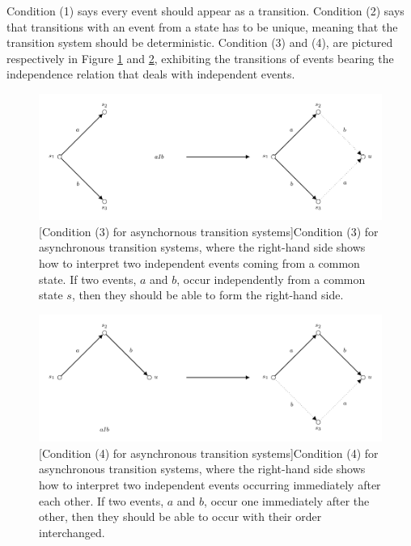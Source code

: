     Condition (1) says every event should appear as a transition. Condition (2) says that transitions with an event from a state has to be unique, meaning that the transition system should be deterministic. Condition (3) and (4), are pictured respectively in Figure \ref{fig:condition-3-asynchronous-transition-systems} and \ref{fig:condition-4-asynchronous-transition-systems}, exhibiting the transitions of events bearing the independence relation that deals with independent events.
    
    \begin{figure}[ht]
        \centering
        \includegraphics[scale=1]{Figures/2.Models-for-concurrency/Asynchronous-transition-system-condition3.pdf}
         [Condition (3) for asynchornous transition systems]{Condition (3) for asynchronous transition systems, where the right-hand side shows how to interpret two independent events coming from a common state. If two events, $a$ and $b$, occur independently from a common state $s$, then they should be able to form the right-hand side.}
        \label{fig:condition-3-asynchronous-transition-systems}
    \end{figure}
    
    \begin{figure}[ht]
        \centering
        \includegraphics[scale=1]{Figures/2.Models-for-concurrency/Asynchronous-transition-system-condition4.pdf}
        [Condition (4) for asynchronous transition systems]{Condition (4) for asynchronous transition systems, where the right-hand side shows how to interpret two independent events occurring immediately after each other. If two events, $a$ and $b$, occur one immediately after the other, then they should be able to occur with their order interchanged.}
        \label{fig:condition-4-asynchronous-transition-systems}
    \end{figure}
    
